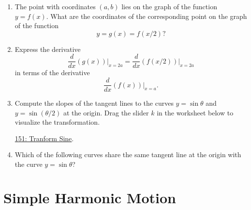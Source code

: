 \documentclass{ximera}
\begin{document}
\begin{question}  \label{QPODFerRE}
\begin{enumerate}

\item The point with coordinates $(a,b)$ lies on the graph of the function $y=f(x)$. What are the coordinates of the corresponding point on the graph of the function 
\[
  y = g(x) = f(x/2)?
\]

\item Express the derivative
\[
    \frac{d}{dx}\left( g(x) \right)\Big|_{x=2a} =  \frac{d}{dx}\left( f(x/2) \right)\Big|_{x=2a}
\]
in terms of the derivative
\[
       \frac{d}{dx}\left(  f(x) \right)\Big|_{x=a} .
\]

\item Compute the slopes of the tangent lines to the curves $y=\sin\theta$ and $y=\sin(\theta/2)$ at the origin. Drag the slider $k$ in the worksheet below to visualize the transformation.

\href{https://www.desmos.com/calculator/2tvlkyi1sj}{151: Tranform Sine}.

 
\begin{onlineOnly}
    \begin{center}
\end{center}
\end{onlineOnly}


\item Which of the following curves share the same tangent line at the origin with the curve $y=\sin\theta$?

\begin{selectAll}
\end{selectAll}


\end{enumerate}
\end{question}


\section{Simple Harmonic Motion}
\end{document}
